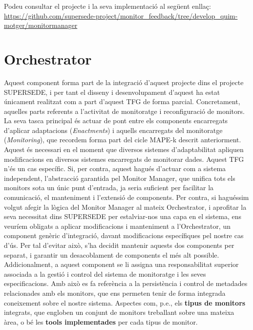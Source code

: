 Podeu consultar el projecte i la seva implementació al següent enllaç:  \url{https://github.com/supersede-project/monitor_feedback/tree/develop_quim-motger/monitormanager}

\section{Orchestrator}

Aquest component forma part de la integració d'aquest projecte dins el projecte SUPERSEDE, i per tant el disseny i desenvolupament d'aquest ha estat únicament realitzat com a part d'aquest TFG de forma parcial. Concretament, aquelles parts referents a l'activitat de monitoratge i reconfiguració de monitors.\\

La seva tasca principal és actuar de pont entre els components encarregats d'aplicar adaptacions (\textit{Enactments}) i aquells encarregats del monitoratge (\textit{Monitoring}), que recordem forma part del cicle MAPE-k descrit anteriorment. Aquest és necessari en el moment que diversos sistemes d'adaptabilitat apliquen modificacions en diversos sistemes encarregats de monitorar dades. Aquest TFG n'és un cas específic. Si, per contra, aquest hagués d'actuar com a sistema independent, l'abstracció garantida pel Monitor Manager, que unifica tots els monitors sota un únic punt d'entrada, ja seria suficient per facilitar la comunicació, el manteniment i l'extensió de components. Per contra, si haguéssim volgut afegir la lògica del Monitor Manager al mateix Orchestrator, i aprofitar la seva necessitat dins SUPERSEDE per estalviar-nos una capa en el sistema, ens veuríem obligats a aplicar modificacions i manteniment a l'Orchestrator, un component genèric d'integració, davant modificacions específiques pel nostre cas d'ús. Per tal d'evitar això, s'ha decidit mantenir aquests dos components per separat, i garantir un desacoblament de components el més alt possible.\\

Addicionalment, a aquest component se li assigna una responsabilitat superior associada a la gestió i control del sistema de monitoratge i les seves especificacions. Amb això es fa referència a la persistència i control de metadades relacionades amb els monitors, que ens permeten tenir de forma integrada coneixement sobre el nostre sistema. Aspectes com, p.e., els \textbf{tipus de monitors} integrats, que engloben un conjunt de monitors treballant sobre una mateixa àrea, o bé les \textbf{tools implementades} per cada tipus de monitor.\\

